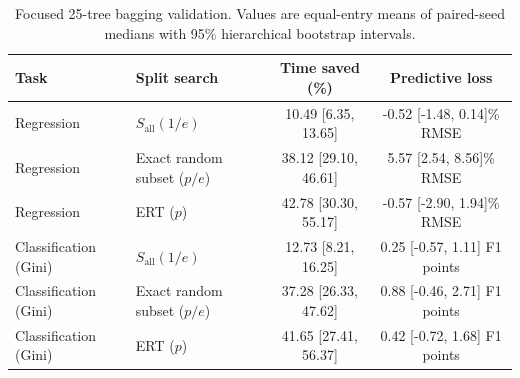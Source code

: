 \begin{table}[!t]
\centering
\caption{Focused 25-tree bagging validation. Values are equal-entry means of paired-seed medians with 95\% hierarchical bootstrap intervals.}
\label{tab:ensemble_validation}
\small
\begin{tabular}{llcc}
\toprule
Task & Split search & Time saved (\%) & Predictive loss \\
\midrule
Regression & $S_{\mathrm{all}}(1/e)$ & 10.49 [6.35, 13.65] & -0.52 [-1.48, 0.14]\% RMSE \\
Regression & Exact random subset ($p/e$) & 38.12 [29.10, 46.61] & 5.57 [2.54, 8.56]\% RMSE \\
Regression & ERT ($p$) & 42.78 [30.30, 55.17] & -0.57 [-2.90, 1.94]\% RMSE \\
Classification (Gini) & $S_{\mathrm{all}}(1/e)$ & 12.73 [8.21, 16.25] & 0.25 [-0.57, 1.11] F1 points \\
Classification (Gini) & Exact random subset ($p/e$) & 37.28 [26.33, 47.62] & 0.88 [-0.46, 2.71] F1 points \\
Classification (Gini) & ERT ($p$) & 41.65 [27.41, 56.37] & 0.42 [-0.72, 1.68] F1 points \\
\bottomrule
\end{tabular}
\end{table}

